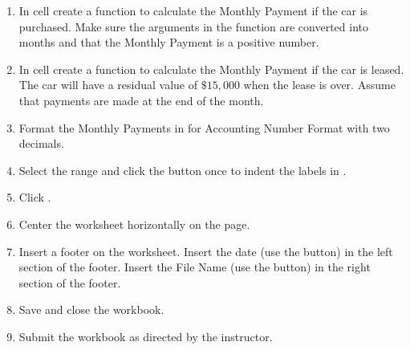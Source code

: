 \begin{enumerate}[resume]
	\item In cell  create a  function to calculate the Monthly Payment if the car is purchased. Make sure the arguments in the  function are converted into months and that the Monthly Payment is a positive number.
	
	\item In cell  create a  function to calculate the Monthly Payment if the car is leased. The car will have a residual value of $ \$15,000 $ when the lease is over. Assume that payments are made at the end of the month.
	
	\item Format the Monthly Payments in  for Accounting Number Format with two decimals.
	
	\item Select the range  and click the  button once to indent the labels in .
	
	\item Click .
	
	\item Center the  worksheet horizontally on the page.
	
	\item Insert a footer on the  worksheet. Insert the date (use the  button) in the left section of the footer. Insert the File Name (use the  button) in the right section of the footer.
	\item Save and close the  workbook.
	\item Submit the  workbook as directed by the instructor.
\end{enumerate}